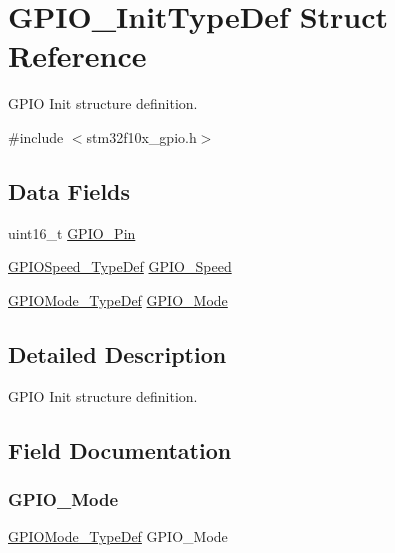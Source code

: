 \hypertarget{struct_g_p_i_o___init_type_def}{}\section{G\+P\+I\+O\+\_\+\+Init\+Type\+Def Struct Reference}
\label{struct_g_p_i_o___init_type_def}


G\+P\+IO Init structure definition.  




{\ttfamily \#include $<$stm32f10x\+\_\+gpio.\+h$>$}

\subsection*{Data Fields}
\begin{DoxyCompactItemize}
\item 
uint16\+\_\+t \mbox{\hyperlink{struct_g_p_i_o___init_type_def_a0beac3d072f6aaaae29e9e2e400b2f11}{G\+P\+I\+O\+\_\+\+Pin}}
\item 
\mbox{\hyperlink{group___g_p_i_o___exported___types_ga062ad92b67b4a1f301c161022cf3ba8e}{G\+P\+I\+O\+Speed\+\_\+\+Type\+Def}} \mbox{\hyperlink{struct_g_p_i_o___init_type_def_a57b08335216f50618ebc080e4fbb0a80}{G\+P\+I\+O\+\_\+\+Speed}}
\item 
\mbox{\hyperlink{group___g_p_i_o___exported___types_ga1347339e1c84a196fabbb31205eec5d4}{G\+P\+I\+O\+Mode\+\_\+\+Type\+Def}} \mbox{\hyperlink{struct_g_p_i_o___init_type_def_a0c7e8901d8b511bbb8c3b153f705dbba}{G\+P\+I\+O\+\_\+\+Mode}}
\end{DoxyCompactItemize}


\subsection{Detailed Description}
G\+P\+IO Init structure definition. 



\subsection{Field Documentation}
\mbox{\label{struct_g_p_i_o___init_type_def_a0c7e8901d8b511bbb8c3b153f705dbba}} 
\subsubsection{\texorpdfstring{GPIO\_Mode}{GPIO\_Mode}}
{\footnotesize\ttfamily \mbox{\hyperlink{group___g_p_i_o___exported___types_ga1347339e1c84a196fabbb31205eec5d4}{G\+P\+I\+O\+Mode\+\_\+\+Type\+Def}} G\+P\+I\+O\+\_\+\+Mode}


